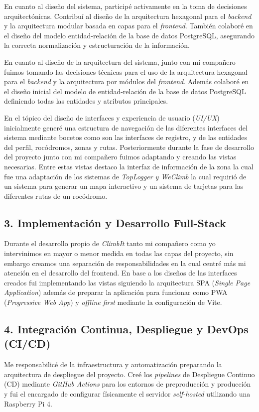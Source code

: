 En cuanto al diseño del sistema, participé activamente en la toma de decisiones arquitectónicas. Contribuí al diseño de la arquitectura hexagonal para el \textit{backend} y la arquitectura modular basada en capas para el \textit{frontend}. También colaboré en el diseño del modelo entidad-relación de la base de datos PostgreSQL, asegurando la correcta normalización y estructuración de la información. 

En cuanto al diseño de la arquitectura del sistema, junto con mi compañero fuimos tomando las decisiones técnicas para el uso de la arquitectura hexagonal para el \textit{backend} y la arquitectura por módulos del \textit{frontend}. Además colaboré en el diseño inicial del modelo de entidad-relación de la base de datos PostgreSQL definiendo todas las entidades y atributos principales.

En el tópico del diseño de interfaces y experiencia de usuario (\textit{UI/UX}) inicialmente generé una estructura de navegación de las diferentes interfaces del sistema mediante bocetos como son las interfaces de registro, y de las entidades del perfil, rocódromos, zonas y rutas. Posteriormente durante la fase de desarrollo del proyecto junto con mi compañero fuimos adaptando y creando las vistas necesarias. Entre estas vistas destaco la interfaz de información de la zona la cual fue una adaptación de los sistemas de \textit{TopLogger y WeClimb} la cual requirió de un sistema para generar un mapa interactivo y un sistema de tarjetas para las diferentes rutas de un rocódromo.

\subsection*{3. Implementación y Desarrollo Full-Stack}

Durante el desarrollo propio de \textit{ClimbIt} tanto mi compañero como yo intervinimos en mayor o menor medida en todas las capas del proyecto, sin embargo creamos una separación de responsabilidades en la cual centré más mi atención en el desarrollo del frontend. En base a los diseños de las interfaces creados fui implementando las vistas siguiendo la arquitectura SPA (\textit{Single Page Application}) además de preparar la aplicación para funcionar como PWA (\textit{Progressive Web App}) y \textit{offline first} mediante la configuración de Vite.

\subsection*{4. Integración Continua, Despliegue y DevOps (CI/CD)}
Me responsabilicé de la infraestructura y automatización preparando la arquitectura de despliegue del proyecto. Creé los \textit{pipelines} de Despliegue Continuo (CD) mediante \textit{GitHub Actions} para los entornos de preproducción y producción y fui el encargado de configurar físicamente el servidor \textit{self-hosted} utilizando una Raspberry Pi 4.

